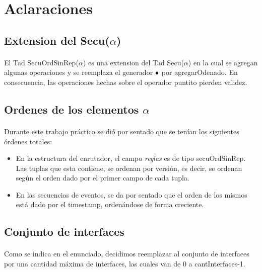 \section*{Aclaraciones}

\subsection*{Extension del Secu($\alpha$)}
\paragraph{}
El Tad SecuOrdSinRep($\alpha$) es una extension del Tad Secu($\alpha$) en la cual se agregan algunas operaciones y se reemplaza el generador $\bullet$ por agregarOdenado. En consecuencia, las operaciones hechas sobre el operador puntito pierden validez.

\subsection*{Ordenes de los elementos $\alpha$}
\paragraph{}
Durante este trabajo pr\'actico se di\'o por sentado que se ten\'ian los siguientes \'ordenes totales:

\begin{itemize}
\item En la estructura del enrutador, el campo \textit{reglas} es de tipo secuOrdSinRep. Las tuplas que esta contiene, se ordenan por versi\'on, es decir, se ordenan seg\'un el orden dado por el primer campo de cada tupla.
\item En las secuencias de eventos, se da por sentado que el orden de los mismos est\'a dado por el timestamp, orden\'andose de forma creciente.
\end{itemize}

\subsection*{Conjunto de interfaces}
\paragraph{}
Como se indica en el enunciado, decidimos reemplazar al conjunto de interfaces por una cantidad m\'axima de interfaces, las cuales van de 0 a cantInterfaces-1.






